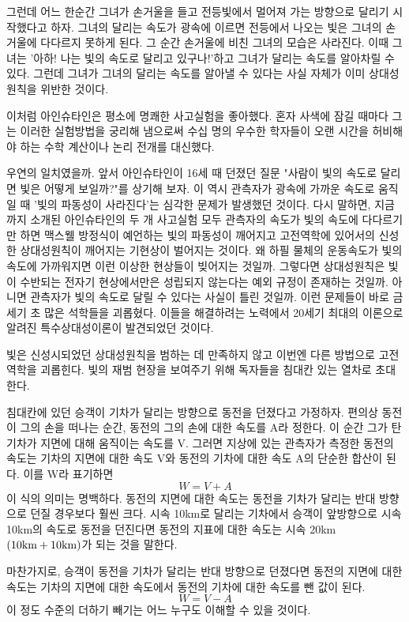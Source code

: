 그런데 어느 한순간 그녀가 손거울을 들고 전등빛에서 멀어져 가는 방향으로 달리기
시작했다고 하자. 그녀의 달리는 속도가 광속에 이르면 전등에서 나오는 빛은 그녀의
손거울에 다다르지 못하게 된다. 그 순간 손거울에 비친 그녀의 모습은 사라진다. 이때
그녀는 '아하! 나는 빛의 속도로 달리고 있구나!'하고 그녀가 달리는 속도를 알아차릴 수
있다. 그런데 그녀가 그녀의 달리는 속도를 알아낼 수 있다는 사실 자체가 이미 상대성원칙을
위반한 것이다.

이처럼 아인슈타인은 평소에 명쾌한 사고실험을 좋아했다. 혼자 사색에 잠길 때마다 그는
이러한 실험방법을 궁리해 냄으로써 수십 명의 우수한 학자들이 오랜 시간을 허비해야 하는
수학 계산이나 논리 전개를 대신했다.

우연의 일치였을까. 앞서 아인슈타인이 16세 때 던졌던 질문 "사람이 빛의 속도로 달리면 빛은
어떻게 보일까?"를 상기해 보자. 이 역시 관측자가 광속에 가까운 속도로 움직일 때 '빛의
파동성이 사라진다'는 심각한 문제가 발생했던 것이다. 다시 말하면, 지금까지 소개된
아인슈타인의 두 개 사고실험 모두 관측자의 속도가 빛의 속도에 다다르기만 하면 맥스웰
방정식이 예언하는 빛의 파동성이 깨어지고 고전역학에 있어서의 신성한 상대성원칙이 깨어지는
기현상이 벌어지는 것이다. 왜 하필 물체의 운동속도가 빛의 속도에 가까워지면 이런 이상한
현상들이 빚어지는 것일까. 그렇다면 상대성원칙은 빛이 수반되는 전자기 현상에서만은 성립되지
않는다는 예외 규정이 존재하는 것일까. 아니면 관측자가 빛의 속도로 달릴 수 있다는 사실이
틀린 것일까. 이런 문제들이 바로 금세기 초 많은 석학들을 괴롭혔다. 이들을 해결하려는
노력에서 20세기 최대의 이론으로 알려진 특수상대성이론이 발견되었던 것이다.

빛은 신성시되었던 상대성원칙을 범하는 데 만족하지 않고 이번엔 다른 방법으로 고전역학을
괴롭힌다. 빛의 재범 현장을 보여주기 위해 독자들을 침대칸 있는 열차로 초대한다.

침대칸에 있던 승객이 기차가 달리는 방향으로 동전을 던졌다고 가정하자. 편의상 동전이 그의
손을 떠나는 순간, 동전의 그의 손에 대한 속도를 A라 정한다. 이 순간 그가 탄 기차가 지면에
대해 움직이는 속도를 V. 그러면 지상에 있는 관측자가 측정한 동전의 속도는 기차의 지면에
대한 속도 V와 동전의 기차에 대한 속도 A의 단순한 합산이 된다. 이를 W라 표기하면
$$  W = V + A $$
이 식의 의미는 명백하다. 동전의 지면에 대한 속도는 동전을 기차가 달리는 반대 방향으로
던질 경우보다 훨씬 크다. 시속 10km로 달리는 기차에서 승객이 앞방향으로 시속 10km의 속도로
동전을 던진다면 동전의 지표에 대한 속도는 시속 20km$(10\hbox{km}+10\hbox{km})$가 되는 것을 말한다.

마찬가지로, 승객이 동전을 기차가 달리는 반대 방향으로 던졌다면 동전의 지면에 대한 속도는
기차의 지면에 대한 속도에서 동전의 기차에 대한 속도를 뺀 값이 된다.
$$ W = V - A$$
이 정도 수준의 더하기 빼기는 어느 누구도 이해할 수 있을 것이다.

